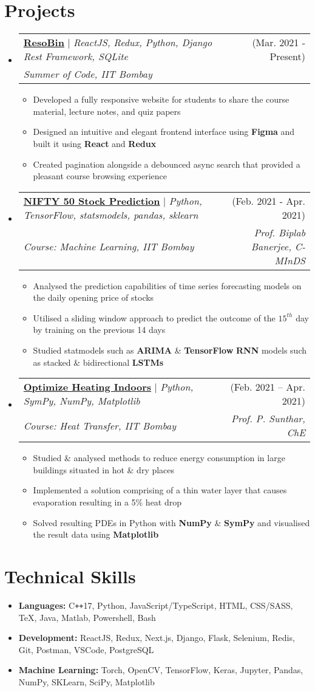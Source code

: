 \documentclass[a4paper,11pt]{article}
\makeatletter
\def\Plus{\texttt{+}}
\newcommand{\techSkill}[2]{\item\small \textbf{#1:} #2 \vspace{-5pt}}
\newcommand{\techSkillListStart}{\begin{itemize}[leftmargin=0.15in, label={}]}
\newcommand{\techSkillListEnd}{\end{itemize}}
\newcommand{\resumeItem}[1]{
  \item\small{
    {#1 \vspace{-2pt}}
  }
}
\newcommand{\resumeProjectHeading}[4]{
    \item
    \begin{tabular*}{\textwidth}{l@{\extracolsep{\fill}}r}
      \small#1 & #2 \\
      \textit{\small#3} & \textit{\small #4}\\
    \end{tabular*}\vspace{-7pt}
}
\newcommand{\resumeSubHeadingListStart}{\begin{itemize}[leftmargin=-0pt, label={}]}
\newcommand{\resumeSubHeadingListEnd}{\end{itemize}}
\newcommand{\resumeItemListStart}{\begin{itemize}}
\newcommand{\resumeItemListEnd}{\end{itemize}\vspace{-5pt}}
\makeatother
\begin{document}
\section{Projects}
\resumeSubHeadingListStart
  \resumeProjectHeading
  {\href{https://github.com/relaxxpls/ResoBin}{\textbf{ResoBin}} $|$ \emph{ReactJS, Redux, Python, Django Rest Framework, SQLite}}{(Mar. 2021 - Present)}
  {Summer of Code, IIT Bombay}{}
  \resumeItemListStart
    \resumeItem{Developed a fully responsive website for students to share the course material, lecture notes, and quiz papers}
    \resumeItem{Designed an intuitive and elegant frontend interface using \textbf{Figma} and built it using \textbf{React} and \textbf{Redux}}
    \resumeItem{Created pagination alongside a debounced async search that provided a pleasant course browsing experience}
  \resumeItemListEnd

  \resumeProjectHeading
  {\href{https://github.com/relaxxpls/StockPrediction}{\textbf{NIFTY 50 Stock Prediction}} $|$ \emph{Python, TensorFlow, statsmodels, pandas, sklearn}}{(Feb. 2021 - Apr. 2021)}
  {Course: Machine Learning, IIT Bombay}{Prof. Biplab Banerjee, C-MInDS}
  \resumeItemListStart
    \resumeItem{Analysed the prediction capabilities of time series forecasting models on the daily opening price of stocks}
    \resumeItem{Utilised a sliding window approach to predict the outcome of the $15^{th}$ day by training on the previous 14 days}
    \resumeItem{Studied statmodels such as \textbf{ARIMA} \& \textbf{TensorFlow} \textbf{RNN} models such as stacked \& bidirectional \textbf{LSTMs}}
  \resumeItemListEnd

  \resumeProjectHeading
  {\href{https://github.com/relaxxpls/Optimize-Heating-Indoors}{\textbf{Optimize Heating Indoors}} $|$ \emph{Python, SymPy, NumPy, Matplotlib}}{(Feb. 2021 -- Apr. 2021)}
  {Course: Heat Transfer, IIT Bombay}{Prof. P. Sunthar, ChE}
  \resumeItemListStart
    \resumeItem{Studied \& analysed methods to reduce energy consumption in large buildings situated in hot \& dry places}
    \resumeItem{Implemented a solution comprising of a thin water layer that causes evaporation resulting in a 5\% heat drop}
    \resumeItem{Solved resulting PDEs in Python with \textbf{NumPy} \& \textbf{SymPy} and visualised the result data using \textbf{Matplotlib}}
  \resumeItemListEnd
\resumeSubHeadingListEnd



\section{Technical Skills}
\techSkillListStart
  \techSkill{Languages}{C\Plus\Plus 17, Python, JavaScript/TypeScript, HTML, CSS/SASS, \TeX, Java, Matlab, Powershell, Bash}
  \techSkill{Development}{ReactJS, Redux, Next.js, Django, Flask, Selenium, Redis, Git, Postman, VSCode, PostgreSQL}
  \techSkill{Machine Learning}{Torch, OpenCV, TensorFlow, Keras, Jupyter, Pandas, NumPy, SKLearn, SciPy, Matplotlib}
\techSkillListEnd
\end{document}
